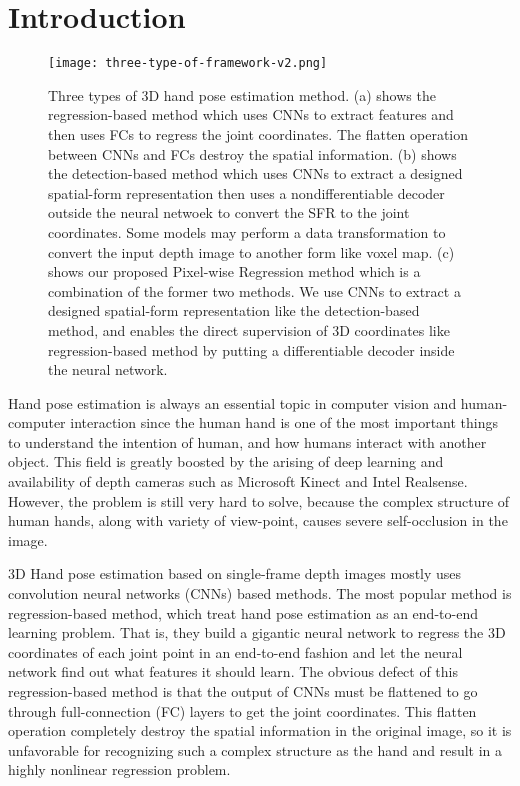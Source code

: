 \documentclass[journal]{IEEEtran}
\begin{document}
\IEEEpeerreviewmaketitle



\section{Introduction}
\label{Introduction}






\begin{figure*}[!t]
  \centering
  \texttt{[image: three-type-of-framework-v2.png]}
  \caption{
    Three types of 3D hand pose estimation method. 
    (a) shows the regression-based method which uses CNNs to extract features and then uses FCs to regress the joint coordinates. 
    The flatten operation between CNNs and FCs destroy the spatial information. 
    (b) shows the detection-based method which uses CNNs to extract a designed spatial-form representation then 
    uses a nondifferentiable decoder outside the neural netwoek to convert the SFR to the joint coordinates. 
    Some models may perform a data transformation to convert the input depth image to another form like voxel map. 
    (c) shows our proposed Pixel-wise Regression method which is a combination of the former two methods. 
    We use CNNs to extract a designed spatial-form representation like the detection-based method, 
    and enables the direct supervision of 3D coordinates like regression-based method by 
    putting a differentiable decoder inside the neural network.
  }
  \label{three_types}    
\end{figure*}

Hand pose estimation is always an essential topic in computer vision and human-computer interaction\cite{vogel2015an} 
since the human hand is one of the most important things to understand the intention of human, 
and how humans interact with another object. 
This field is greatly boosted by the arising of deep learning and availability of depth cameras 
such as Microsoft Kinect and Intel Realsense\cite{iii2018depth}. 
However, the problem is still very hard to solve, 
because the complex structure of human hands, along with variety of view-point, causes severe self-occlusion in the image.

3D Hand pose estimation based on single-frame depth images mostly uses convolution neural networks (CNNs) based methods\cite{yuan2018depth}. 
The most popular method is regression-based method, which treat hand pose estimation as an end-to-end learning problem. 
That is, they build a gigantic neural network to regress the 3D coordinates of each joint point in an end-to-end fashion and let the neural network find out what features it should learn. 
The obvious defect of this regression-based method is that the output of CNNs must be flattened to go through full-connection (FC) layers to get the joint coordinates. 
This flatten operation completely destroy the spatial information in the original image, 
so it is unfavorable for recognizing such a complex structure as the hand and result in a highly nonlinear regression problem. 
\end{document}
